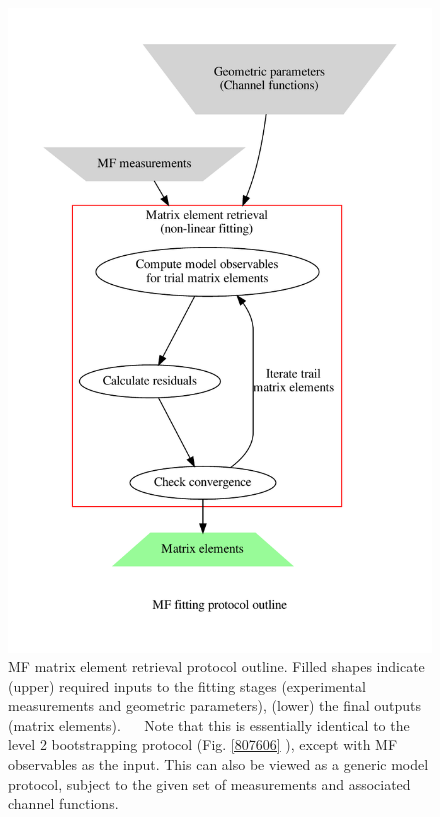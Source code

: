 \documentclass[10pt]{article}
\begin{document}
\begin{figure}[]
\begin{center}
\includegraphics[width=\textwidth,height=\dimexpr\textheight-4\baselineskip-\abovecaptionskip-\belowcaptionskip\relax,keepaspectratio]{figures/MF_fitting_flowchart_290822.gv.pdf}
\caption{MF matrix element retrieval protocol outline. Filled shapes indicate (upper) required inputs to the fitting stages (experimental measurements and geometric parameters), (lower) the final outputs (matrix elements).    Note that this is essentially identical to the level 2 bootstrapping protocol (Fig. \ref{807606} ), except with MF observables as the input. This can also be viewed as a generic model protocol, subject to the given set of measurements and associated channel functions.\label{671760}}
\end{center}
\end{figure}
\end{document}
